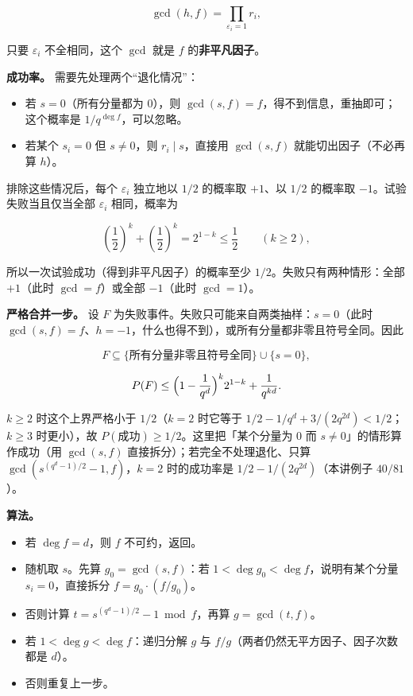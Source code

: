 \[
\gcd(h,f)=\prod_{\varepsilon_i=1}r_i ,
\]

只要 $\varepsilon_i$ 不全相同，这个 $\gcd$ 就是 $f$ 的\textbf{非平凡因子}。

\textbf{成功率。} 需要先处理两个“退化情况”：

\begin{itemize}
\item 若 $s=0$（所有分量都为 $0$），则 $\gcd(s,f)=f$，得不到信息，重抽即可；这个概率是 $1/q^{\deg f}$，可以忽略。
\item 若某个 $s_i=0$ 但 $s\ne0$，则 $r_i\mid s$，直接用 $\gcd(s,f)$ 就能切出因子（不必再算 $h$）。
\end{itemize}


排除这些情况后，每个 $\varepsilon_i$ 独立地以 $1/2$ 的概率取 $+1$、以 $1/2$ 的概率取 $-1$。试验失败当且仅当全部 $\varepsilon_i$ 相同，概率为

\[
\left(\frac12\right)^k+\left(\frac12\right)^k=2^{1-k}\le\frac12\qquad(k\ge2),
\]

所以一次试验成功（得到非平凡因子）的概率至少 $1/2$。失败只有两种情形：全部 $+1$（此时 $\gcd=f$）或全部 $-1$（此时 $\gcd=1$）。

\textbf{严格合并一步。} 设 $F$ 为失败事件。失败只可能来自两类抽样：$s=0$（此时 $\gcd(s,f)=f$、$h=-1$，什么也得不到），或所有分量都非零且符号全同。因此

\[
F\subseteq\{\text{所有分量非零且符号全同}\}\cup\{s=0\},
\]

\[
P(F)\le\Bigl(1-\frac1{q^d}\Bigr)^k 2^{1-k}+\frac1{q^{kd}} .
\]

$k\ge2$ 时这个上界严格小于 $1/2$（$k=2$ 时它等于 $1/2-1/q^d+3/(2q^{2d})<1/2$；$k\ge3$ 时更小），故 $P(\text{成功})\ge1/2$。这里把「某个分量为 $0$ 而 $s\ne0$」的情形算作成功（用 $\gcd(s,f)$ 直接拆分）；若完全不处理退化、只算 $\gcd(s^{(q^d-1)/2}-1,f)$，$k=2$ 时的成功率是 $1/2-1/(2q^{2d})$（本讲例子 $40/81$）。

\textbf{算法。}

\begin{itemize}
\item 若 $\deg f=d$，则 $f$ 不可约，返回。
\item 随机取 $s$。先算 $g_0=\gcd(s,f)$：若 $1<\deg g_0<\deg f$，说明有某个分量 $s_i=0$，直接拆分 $f=g_0\cdot(f/g_0)$。
\item 否则计算 $t=s^{(q^d-1)/2}-1\bmod f$，再算 $g=\gcd(t,f)$。
\item 若 $1<\deg g<\deg f$：递归分解 $g$ 与 $f/g$（两者仍然无平方因子、因子次数都是 $d$）。
\item 否则重复上一步。
\end{itemize}


